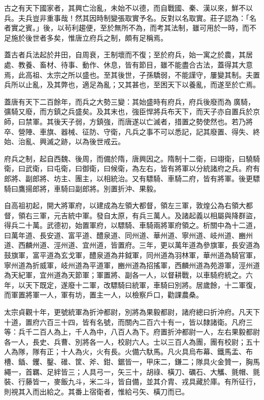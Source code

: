 
\begin{pinyinscope}

 古之有天下國家者，其興亡治亂，未始不以德，而自戰國、秦、漢以來，鮮不以兵。夫兵豈非重事哉！然其因時制變張取實予名。反對以名取實。莊子認為：「名者實之賓。」後，以茍利趨便，至於無所不為，而考其法制，雖可用於一時，而不足施於後世者多矣，惟唐立府兵之制，頗有足稱焉。



 蓋古者兵法起於井田，自周衰，王制壞而不復；至於府兵，始一寓之於農，其居處、教養、畜材、待事、動作、休息，皆有節目，雖不能盡合古法，蓋得其大意焉，此高祖、太宗之所以盛也。至其後世，子孫驕弱，不能謹守，屢變其制。夫置兵所以止亂，及其弊也，適足為亂；又其甚也，至困天下以養亂，而遂至於亡焉。



 蓋唐有天下二百餘年，而兵之大勢三變：其始盛時有府兵，府兵後廢而為廣騎，彍騎又廢，而方鎮之兵盛矣。及其末也，強臣悍將兵布天下，而天子亦自置兵於京師，曰禁軍。其後天子弱，方鎮強，而唐遂以亡滅者，措置之勢使然也。若乃將卒、營陣、車旗、器械、征防、守衛，凡兵之事不可以悉記，記其廢置、得失、終始、治亂、興滅之跡，以為後世戒云。



 府兵之制，起自西魏、後周，而備於隋，唐興因之。隋制十二衛，曰翊衛，曰驍騎衛，曰武衛，曰屯衛，曰御衛，曰候衛，為左右，皆有將軍以分統諸府之兵。府有郎將、副郎將、坊主、團主，以相統治。又有驃騎、車騎二府，皆有將軍。後更驃騎曰鷹揚郎將，車騎曰副郎將。別置折沖、果毅。



 自高祖初起，開大將軍府，以建成為左領大都督，領左三軍，敦煌公為右領大都督，領右三軍，元吉統中軍。發自太原，有兵三萬人。及諸起義以相屬與降群盜，得兵二十萬。武德初，始置軍府，以驃騎、車騎兩將軍府領之。析關中為十二道，曰萬年道、長安道、富平道、醴泉道、同州道、華州道、寧州道、岐州道、豳州道、西麟州道、涇州道、宜州道，皆置府。三年，更以萬年道為參旗軍，長安道為鼓旗軍，富平道為玄戈軍，醴泉道為井鉞軍，同州道為羽林軍，華州道為騎官軍，寧州道為折威軍，岐州道為平道軍，豳州道為招搖軍，西麟州道為苑游軍，涇州道為天紀軍，宜州道為天節軍；軍置將、副各一人，以督耕戰，以車騎府統之。六年，以天下既定，遂廢十二軍，改驃騎曰統軍，車騎曰別將。居歲餘，十二軍復，而軍置將軍一人，軍有坊，置主一人，以檢察戶口，勸課農桑。



 太宗貞觀十年，更號統軍為折沖都尉，別將為果毅都尉，諸府總曰折沖府。凡天下十道，置府六百三十四，皆有名號，而關內二百六十有一，皆以隸諸衛。凡府三等：兵千二百人為上，千人為中，八百人為下。府置折沖都尉一人，左右果毅都尉各一人，長史、兵曹、別將各一人，校尉六人。士以三百人為團，團有校尉；五十人為隊，隊有正；十人為火，火有長。火備六馱馬。凡火具烏布幕、鐵馬盂、布槽、鍤、钁、鑿、碓、筐、斧、鉗、鋸皆一，甲床二，鎌二；隊具火金贊一，胸馬繩一，首羈、足絆皆三；人具弓一，矢三十，胡祿、橫刀、礪石、大觿、氈帽、氈裝、行藤皆一，麥飯九斗，米二斗，皆自備，並其介胄、戎具藏於庫。有所征行，則視其入而出給之。其番上宿衛者，惟給弓矢、橫刀而已。




\end{pinyinscope}
